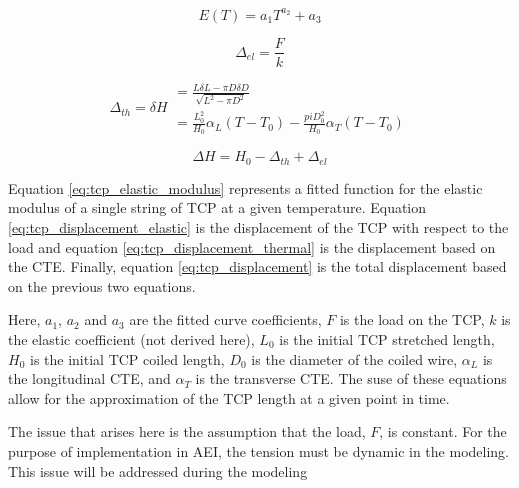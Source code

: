 	\begin{equation}
	\label{eq:tcp_elastic_modulus}
		E(T) = a_{1} T^{a_{2}} + a_{3}
	\end{equation}
	
	\begin{equation}
	\label{eq:tcp_displacement_elastic}
		\Delta_{el} = \frac{F}{k}
	\end{equation}
	
	\begin{equation}
	\label{eq:tcp_displacement_thermal}
		\Delta_{th} = \delta H
		\begin{matrix}			
			= \frac{L \delta L - \pi D \delta D}{\sqrt{L^{2} - \pi D^{2}}} \\
			= \frac{L^{2}_{0}}{H_{0}} \alpha_{L} (T - T_{0}) - \frac{pi D^{2}_{0}}{H_{0}} \alpha_{T} (T - T_{0})
		\end{matrix}
	\end{equation}
	
	\begin{equation}
	\label{eq:tcp_displacement}
		\Delta H = H_{0} - \Delta_{th} + \Delta_{el}
	\end{equation}
	
	Equation \ref{eq:tcp_elastic_modulus} represents a fitted function for the elastic modulus of a single string of TCP at a given temperature. Equation \ref{eq:tcp_displacement_elastic} is the displacement of the TCP with respect to the load and equation \ref{eq:tcp_displacement_thermal} is the displacement based on the CTE. Finally, equation \ref{eq:tcp_displacement} is the total displacement based on the previous two equations.
	
	Here, $a_{1}$, $a_{2}$ and $a_{3}$ are the fitted curve coefficients, $F$ is the load on the TCP, $k$ is the elastic coefficient (not derived here), $L_{0}$ is the initial TCP stretched length, $H_{0}$ is the initial TCP coiled length, $D_{0}$ is the diameter of the coiled wire, $\alpha_{L}$ is the longitudinal CTE, and $\alpha_{T}$ is the transverse CTE. The suse of these equations allow for the approximation of the TCP length at a given point in time.
	
	The issue that arises here is the assumption that the load, $F$, is constant. For the purpose of implementation in AEI, the tension must be dynamic in the modeling. This issue will be addressed during the modeling 